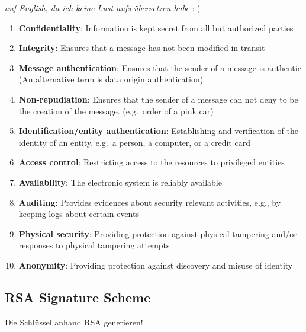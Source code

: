 \documentclass[
  10pt,
  a4paper,
]{article}
\providecommand{\tightlist}{%
  \setlength{\itemsep}{0pt}\setlength{\parskip}{0pt}}\usepackage{longtable,booktabs,array}
\begin{document}
\begin{multicols*}{2}
\emph{auf English, da ich keine Lust aufs übersetzen habe} :-)

\begin{enumerate}
\def\labelenumi{\arabic{enumi}.}
\tightlist
\item
  \textbf{Confidentiality}: Information is kept secret from all but
  authorized parties
\item
  \textbf{Integrity}: Ensures that a message has not been modified in
  transit
\item
  \textbf{Message authentication}: Ensures that the sender of a message
  is authentic (An alternative term is data origin authentication)
\item
  \textbf{Non-repudiation}: Ensures that the sender of a message can not
  deny to be the creation of the message. (e.g.~order of a pink car)
\item
  \textbf{Identification/entity authentication}: Establishing and
  verification of the identity of an entity, e.g.~a person, a computer,
  or a credit card
\item
  \textbf{Access control}: Restricting access to the resources to
  privileged entities
\item
  \textbf{Availability}: The electronic system is reliably available
\item
  \textbf{Auditing}: Provides evidences about security relevant
  activities, e.g., by keeping logs about certain events
\item
  \textbf{Physical security}: Providing protection against physical
  tampering and/or responses to physical tampering attempts
\item
  \textbf{Anonymity}: Providing protection against discovery and misuse
  of identity
\end{enumerate}

\subsection{RSA Signature Scheme}\label{rsa-signature-scheme}

Die Schlüssel anhand RSA generieren!


\end{multicols*}
\end{document}
